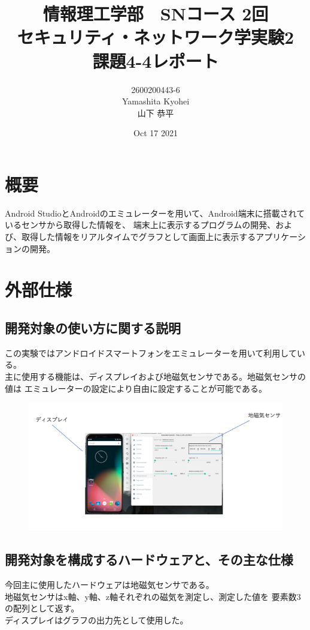 \documentclass[dvipdfmx,autodetect-engine,titlepage]{jsarticle}
\title{情報理工学部　SNコース 2回\\
セキュリティ・ネットワーク学実験2\\
課題4-4レポート}
\author{2600200443-6\\Yamashita Kyohei\\山下 恭平}
\date{Oct 17 2021}
\begin{document}
\maketitle

\section{概要}
Android StudioとAndroidのエミュレーターを用いて、Android端末に搭載されているセンサから取得した情報を、
端末上に表示するプログラムの開発、および、取得した情報をリアルタイムでグラフとして画面上に表示するアプリケーションの開発。

\section{外部仕様}

 \subsection{開発対象の使い方に関する説明}

 この実験ではアンドロイドスマートフォンをエミュレーターを用いて利用している。\\
 主に使用する機能は、ディスプレイおよび地磁気センサである。地磁気センサの値は
 エミュレーターの設定により自由に設定することが可能である。
 
 \begin{figure}[h]
    \centering
    \includegraphics[scale=0.4]{pic0.png}
  \end{figure}
 
 \subsection{開発対象を構成するハードウェアと、その主な仕様}

 今回主に使用したハードウェアは地磁気センサである。\\
 地磁気センサはx軸、y軸、z軸それぞれの磁気を測定し、測定した値を
 要素数3の配列として返す。\\
 ディスプレイはグラフの出力先として使用した。
\end{document}
